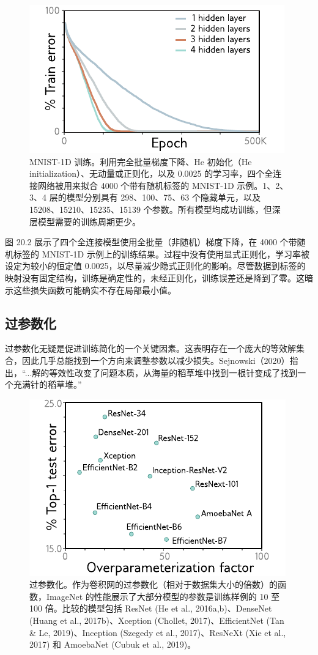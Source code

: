 \documentclass[lang=cn,newtx,10pt,scheme=chinese]{elegantbook}
\begin{document}
\begin{figure}[ht!]
\centering
\includegraphics[width=0.7\linewidth]{PDFFigures/UDLChap21PDF/WhyGDResults.pdf}
\caption{MNIST-1D 训练。利用完全批量梯度下降、He 初始化（He initialization）、无动量或正则化，以及 0.0025 的学习率，四个全连接网络被用来拟合 4000 个带有随机标签的 MNIST-1D 示例。1、2、3、4 层的模型分别具有 298、100、75、63 个隐藏单元，以及 15208、15210、15235、15139 个参数。所有模型均成功训练，但深层模型需要的训练周期更少。}
\end{figure}

图 20.2 展示了四个全连接模型使用全批量（非随机）梯度下降，在 4000 个带随机标签的 MNIST-1D 示例上的训练结果。过程中没有使用显式正则化，学习率被设定为较小的恒定值 0.0025，以尽量减少隐式正则化的影响。尽管数据到标签的映射没有固定结构，训练是确定性的，未经正则化，训练误差还是降到了零。这暗示这些损失函数可能确实不存在局部最小值。

\subsection{过参数化}
过参数化无疑是促进训练简化的一个关键因素。这表明存在一个庞大的等效解集合，因此几乎总能找到一个方向来调整参数以减少损失。Sejnowski（2020）指出，“...解的等效性改变了问题本质，从海量的稻草堆中找到一根针变成了找到一个充满针的稻草堆。”


\begin{figure}[ht!]
\centering
\includegraphics[width=0.7\linewidth]{PDFFigures/UDLChap21PDF/WhyOverparam.pdf}
\caption{过参数化。作为卷积网的过参数化（相对于数据集大小的倍数）的函数，ImageNet 的性能展示了大部分模型的参数是训练样例的 10 至 100 倍。比较的模型包括 ResNet (He et al., 2016a,b)、DenseNet (Huang et al., 2017b)、Xception (Chollet, 2017)、EfficientNet (Tan \& Le, 2019)、Inception (Szegedy et al., 2017)、ResNeXt (Xie et al., 2017) 和 AmoebaNet (Cubuk et al., 2019)。}
\end{figure}
\end{document}

